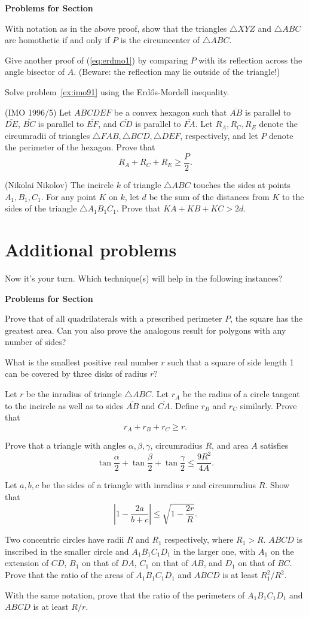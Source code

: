 \documentclass[12pt]{book}
\newcounter{exc}
\numberwithin{exc}{section}
\numberwithin{figure}{section}
\newenvironment{exer}{\vspace{0.1in}
\noindent \textbf{Problems for Section~\thesection} \vspace{0.1in}
\begin{list}{\arabic{exc}.}{\usecounter{exc}}}{\end{list}}
\numberwithin{equation}{theorem}
\def\ii{\item}
\def\seg#1{\overline{#1}}
\begin{document}
\begin{exer}
\ii
With notation as in the above proof,
show that the triangles $\triangle XYZ$ and 
$\triangle ABC$ are homothetic if and only 
if $P$ is the circumcenter of $\triangle ABC$.
\ii
Give another proof of (\ref{eq:erdmo1}) by comparing $P$ with its 
reflection across the angle bisector of $A$. (Beware: the reflection may 
lie outside of the triangle!)
\ii
Solve problem~\ref{ex:imo91} using the Erd\H{o}s-Mordell inequality.
\ii
(IMO 1996/5) \label{ex:imo965}
Let $ABCDEF$ be a convex hexagon such that $\seg{AB}$ is parallel to 
$\seg{DE}$, 
$\seg{BC}$ is parallel to $\seg{EF}$, and 
$\seg{CD}$ is parallel to $\seg{FA}$. Let $R_{A}, 
R_{C}, R_{E}$ denote the circumradii of triangles $\triangle FAB, 
\triangle BCD, \triangle DEF$, 
respectively, and let $P$ denote the perimeter of the hexagon. Prove 
that
\[
R_{A} + R_{C} + R_{E} \geq \frac P2.
\]
\ii (Nikolai Nikolov) 
The incircle $k$ of triangle $\triangle ABC$ touches the sides at points
$A_1, B_1, C_1$. For any point $K$ on $k$, let $d$ be the sum of the
distances from $K$ to the sides of the triangle $\triangle A_1B_1C_1$. Prove
that $KA + KB + KC > 2d$.
\end{exer}

\section{Additional problems}

Now it's your turn. Which technique(s) will help in the following instances?

\begin{exer}
\ii
Prove that of all quadrilaterals with a prescribed perimeter $P$, the 
square has the greatest area. Can you also prove the analogous result
for polygons with any number of sides?
\ii
What is the smallest positive real number $r$ such that a square of 
side length 1 can be covered by three disks of radius $r$?
\ii \label{ex:incircles}
Let $r$ be the inradius of triangle $\triangle ABC$. Let $r_A$ be the radius
of a circle tangent to the incircle as well as to sides 
$\seg{AB}$ and $\seg{CA}$.
Define $r_B$ and $r_C$ similarly. Prove that
\[
r_A + r_B + r_C \geq r.
\]
\ii
Prove that a triangle with angles $\alpha, \beta, \gamma$, 
circumradius $R$, and area $A$ satisfies
\[
\tan \frac{\alpha}{2} + \tan \frac{\beta}{2} + \tan \frac{\gamma}{2}
\leq \frac{9R^2}{4A}.
\]
\ii %
Let $a,b,c$ be the sides of a triangle with inradius $r$ and 
circumradius $R$. Show that
\[
\left\lvert 1 - \frac{2a}{b+c} \right\rvert \leq \sqrt{1 - 
\frac{2r}{R}}.
\]
\ii %
Two concentric circles have radii $R$ and $R_{1}$ respectively, where 
$R_{1} > R$. $ABCD$ is inscribed in the smaller circle and 
$A_{1}B_{1}C_{1}D_{1}$ in the larger one, with $A_{1}$ on the 
extension of $CD$, $B_{1}$ on that of $DA$, $C_{1}$ on that of $AB$, and 
$D_{1}$ on that of $BC$. Prove that the ratio of the areas of 
$A_{1}B_{1}C_{1}D_{1}$ and $ABCD$ is at least $R_{1}^{2}/R^{2}$.
\ii %
With the same notation, prove that the ratio of the perimeters of 
$A_{1}B_{1}C_{1}D_{1}$ and $ABCD$ is at least $R/r$.
\end{exer}
\end{document}

